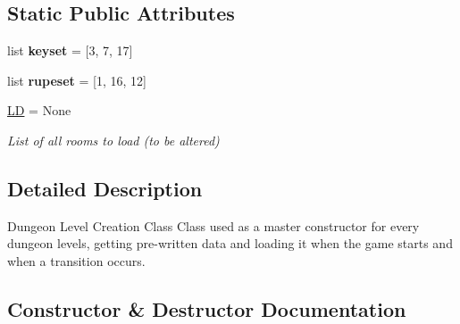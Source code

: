 \subsection*{Static Public Attributes}
\begin{DoxyCompactItemize}
\item 
\mbox{\label{classcollision_1_1levelmanager_1_1_level_manager_aeaa35419e04210eb9b2c8b41a496fbb2}} 
list {\bfseries keyset} = \mbox{[}3, 7, 17\mbox{]}
\item 
\mbox{\label{classcollision_1_1levelmanager_1_1_level_manager_a116fbcd53b1b8da40479cb5db10e21ac}} 
list {\bfseries rupeset} = \mbox{[}1, 16, 12\mbox{]}
\item 
\mbox{\label{classcollision_1_1levelmanager_1_1_level_manager_a6f0eec0ff65ac73c32225d1b9cd0ecaa}} 
\hyperlink{classcollision_1_1levelmanager_1_1_level_manager_a6f0eec0ff65ac73c32225d1b9cd0ecaa}{LD} = None
\begin{DoxyCompactList}\small\item\em List of all rooms to load (to be altered) \end{DoxyCompactList}\end{DoxyCompactItemize}


\subsection{Detailed Description}
Dungeon Level Creation Class  Class used as a master constructor for every dungeon levels, getting pre-\/written data and loading it when the game starts and when a transition occurs. 

\subsection{Constructor \& Destructor Documentation}
\mbox{\label{classcollision_1_1levelmanager_1_1_level_manager_ac15451905c2523ed3929d877762bb290}} 
